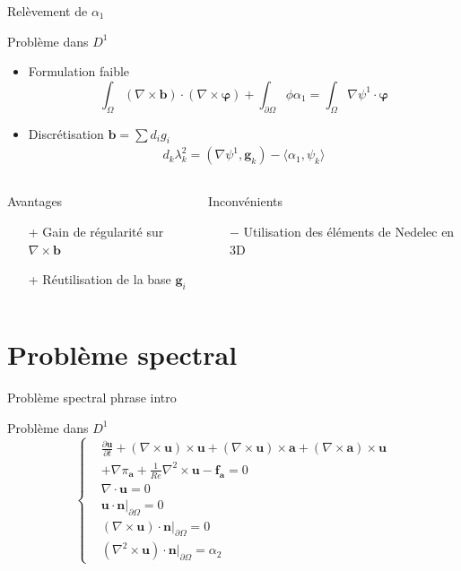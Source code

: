 \documentclass{beamer}
\newcommand{\grad}{{\nabla}}
\newcommand{\rot}{{\nabla\times}}
\newcommand{\rott}{{\nabla^2\times}}
\renewcommand{\div}{{\nabla\cdot}}
\newcommand{\restr}{{\big\rvert_{\partial\Omega}}}
\begin{document}
\begin{frame}{Relèvement de $\alpha_1$}
\begin{block}{Problème dans $ D^1$}
\begin{itemize}
\item Formulation faible
\[ \int_\Omega (\rot\mathbf{b})\cdot(\rot\bm{\varphi}) + \int_{\partial\Omega} \phi\alpha_1 = \int_\Omega \grad\psi^1\cdot\bm{\varphi} \]
\item Discrétisation $\mathbf{b}=\sum d_ig_i$
\begin{align*}
d_k\lambda_k^2 = (\grad\psi^1,\mathbf{g}_k) - \langle\alpha_1,\psi_k\rangle
\end{align*}
\end{itemize}
\end{block}
\begin{columns}[t]
\begin{column}{5cm}
\begin{exampleblock}{Avantages}
\begin{itemize}
\item[+] Gain de régularité sur $\rot \mathbf{b}$
\item[+] Réutilisation de la base $\mathbf{g}_i$ 
\end{itemize}
\end{exampleblock}
\end{column}
\begin{column}{5cm}
\begin{alertblock}{Inconvénients}
\begin{itemize}
\item[$-$] Utilisation des éléments de Nedelec en 3D
\end{itemize}
\end{alertblock}
\end{column}
\end{columns}
\end{frame}

\section{Problème spectral}
\begin{frame}{Problème spectral}
phrase intro
\begin{block}{Problème dans $ D^1$}
\[\left\{\begin{aligned}
&\frac{\partial \mathbf{u}}{\partial t} + (\rot \mathbf{u})\times \mathbf{u} + (\rot \mathbf{u})\times \mathbf{a} + \left(\rot \mathbf{a}\right)\times \mathbf{u} \\
&+ \grad\pi_\mathbf{a} + \frac{1}{Re}\rott \mathbf{u} - \mathbf{f_a} = 0\\
&\div \mathbf{u} = 0\\
&\mathbf{u}\cdot \mathbf{n}\restr = 0\\
&(\rot \mathbf{u})\cdot \mathbf{n}\restr = 0\\
&(\rott \mathbf{u})\cdot \mathbf{n}\restr = \alpha_2
\end{aligned}\right.\]
\end{block}
\end{frame}
\end{document}
